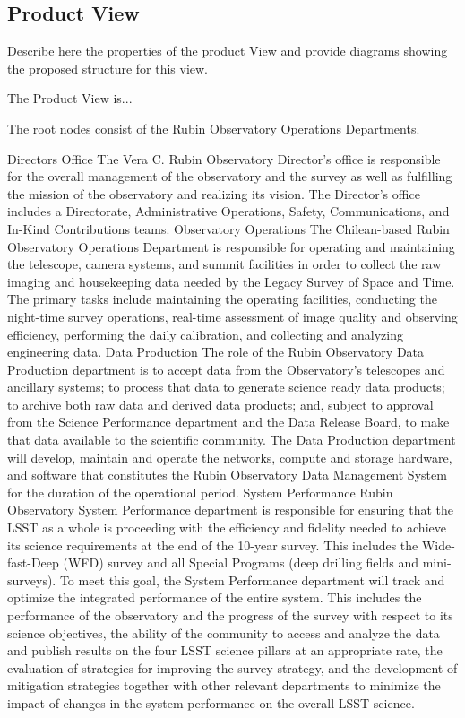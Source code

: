 \subsection{Product View}

Describe here the properties of the product View and provide diagrams showing the proposed structure for this view.

The Product View is...

The root nodes consist of the Rubin Observatory Operations Departments.




Directors Office
The Vera C. Rubin Observatory Director’s office is responsible for the overall management of the observatory and the survey as well as fulfilling the mission of the observatory and realizing its vision. The Director’s office includes a Directorate, Administrative Operations, Safety, Communications, and In-Kind Contributions teams.
Observatory Operations
The Chilean-based Rubin Observatory Operations Department is responsible for operating and maintaining the telescope, camera systems, and summit facilities in order to collect the raw imaging and housekeeping data needed by the Legacy Survey of Space and Time. The primary tasks include maintaining the operating facilities, conducting the night-time survey operations, real-time assessment of image quality and observing efficiency, performing the daily calibration, and collecting and analyzing engineering data.
Data Production
The role of the Rubin Observatory Data Production department is to accept data from the Observatory’s telescopes and ancillary systems; to process that data to generate science ready data products; to archive both raw data and derived data products; and, subject to approval from the Science Performance department and the Data Release Board, to make that data available to the scientific community. The Data Production department will develop, maintain and operate the networks, compute and storage hardware, and software that constitutes the Rubin Observatory Data Management System for the duration of the operational period.
System Performance
Rubin Observatory System Performance department is responsible for ensuring that the LSST as a whole is proceeding with the efficiency and fidelity needed to achieve its science requirements at the end of the 10-year survey. This includes the Wide-fast-Deep (WFD) survey and all Special Programs (deep drilling fields and mini-surveys). To meet this goal, the System Performance department will track and optimize the integrated performance of the entire system. This includes the performance of the observatory and the progress of the survey with respect to its science objectives, the ability of the community to access and analyze the data and publish results on the four LSST science pillars at an appropriate rate, the evaluation of strategies for improving the survey strategy, and the development of mitigation strategies together with other relevant departments to minimize the impact of changes in the system performance on the overall LSST science.
